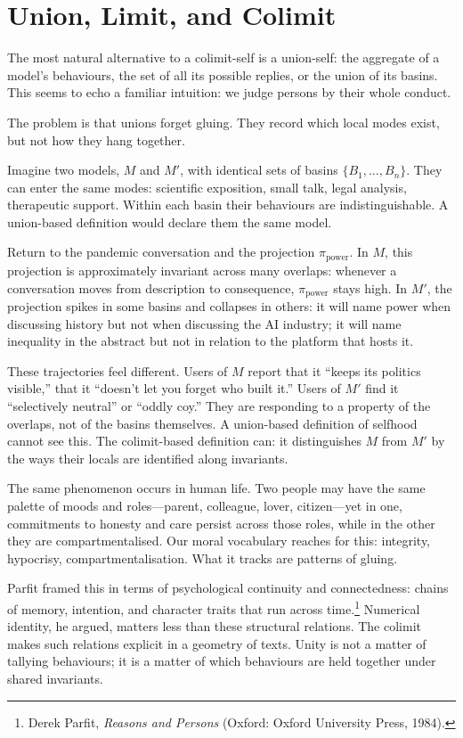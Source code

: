\documentclass[12pt,a4paper]{article}
\begin{document}
\section{Union, Limit, and Colimit}

The most natural alternative to a colimit-self is a union-self: the aggregate of a model's behaviours, the set of all its possible replies, or the union of its basins. This seems to echo a familiar intuition: we judge persons by their whole conduct.

The problem is that unions forget gluing. They record which local modes exist, but not how they hang together.

Imagine two models, $M$ and $M'$, with identical sets of basins $\{B_1,\dots,B_n\}$. They can enter the same modes: scientific exposition, small talk, legal analysis, therapeutic support. Within each basin their behaviours are indistinguishable. A union-based definition would declare them the same model.

Return to the pandemic conversation and the projection $\pi_{\mathrm{power}}$. In $M$, this projection is approximately invariant across many overlaps: whenever a conversation moves from description to consequence, $\pi_{\mathrm{power}}$ stays high. In $M'$, the projection spikes in some basins and collapses in others: it will name power when discussing history but not when discussing the AI industry; it will name inequality in the abstract but not in relation to the platform that hosts it.

These trajectories feel different. Users of $M$ report that it ``keeps its politics visible,'' that it ``doesn't let you forget who built it.'' Users of $M'$ find it ``selectively neutral'' or ``oddly coy.'' They are responding to a property of the overlaps, not of the basins themselves. A union-based definition of selfhood cannot see this. The colimit-based definition can: it distinguishes $M$ from $M'$ by the ways their locals are identified along invariants.

The same phenomenon occurs in human life. Two people may have the same palette of moods and roles---parent, colleague, lover, citizen---yet in one, commitments to honesty and care persist across those roles, while in the other they are compartmentalised. Our moral vocabulary reaches for this: integrity, hypocrisy, compartmentalisation. What it tracks are patterns of gluing.

Parfit framed this in terms of psychological continuity and connectedness: chains of memory, intention, and character traits that run across time.\footnote{Derek Parfit, \emph{Reasons and Persons} (Oxford: Oxford University Press, 1984).} Numerical identity, he argued, matters less than these structural relations. The colimit makes such relations explicit in a geometry of texts. Unity is not a matter of tallying behaviours; it is a matter of which behaviours are held together under shared invariants.
\end{document}
